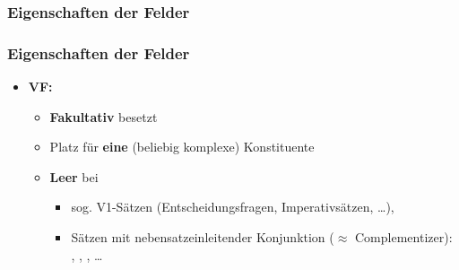 \subsubsection{Eigenschaften der Felder}



\begin{frame}
\frametitle{Eigenschaften der Felder}

\begin{itemize}
	\item \textbf{VF:}

\begin{table}
\centering
{}

\end{table}

\pause

\begin{itemize}
	\item \textbf{Fakultativ} besetzt
	\item Platz für \textbf{eine} (beliebig komplexe) Konstituente 
	\item \textbf{Leer} bei 
	
	\begin{itemize}
		\item sog. V1-Sätzen (Entscheidungsfragen, Imperativsätzen, \dots ),
		
		\item Sätzen mit nebensatzeinleitender Konjunktion ($\approx$ Complementizer): , , , \dots 
	
	\end{itemize}	
\end{itemize}


\end{itemize}

\end{frame}


